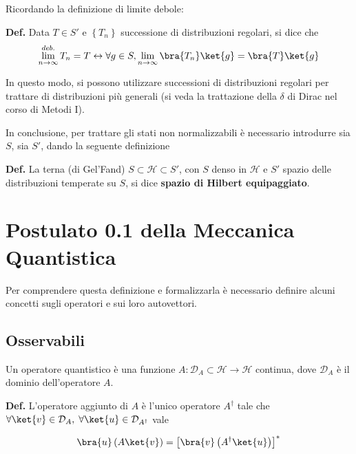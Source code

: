 Ricordando la definizione di limite debole:

\textbf{Def.} Data $ T\in S' $ e $\left\{ T_n \right\}$ successione di distribuzioni
regolari, si dice che 
$$ \lim\limits_{n\to\infty}^{deb.} T_n = T \leftrightarrow 
\forall g\in S, \lim\limits_{n\to\infty} \bra{T_n}\ket{g} = \bra{T}\ket{g}$$

In questo modo, si possono utilizzare successioni di distribuzioni regolari per
trattare di distribuzioni più generali (si veda la trattazione della $ \delta $ di 
Dirac nel corso di Metodi I).

In conclusione, per trattare gli stati non normalizzabili è necessario introdurre sia
$ S $, sia $ S' $, dando la seguente definizione

\textbf{Def.} La terna (di Gel'Fand) $ S\subset\mathcal{H}\subset S' $, con $S$ denso in
$ \mathcal{H} $ e $ S' $ spazio delle distribuzioni temperate su $ S$, si dice 
\textbf{spazio di Hilbert equipaggiato}.
\newpage

\section{Postulato 0.1 della Meccanica Quantistica}

\noindent{}

Per comprendere questa definizione e formalizzarla è necessario definire alcuni concetti sugli
operatori e sui loro autovettori.

\subsection{Osservabili}

Un operatore quantistico è una funzione $ A: \mathcal{D}_A\subset\mathcal{H}\to\mathcal{H} $
continua, dove $ \mathcal{D}_A $ è il dominio dell'operatore $ A $.

\textbf{Def.} L'operatore aggiunto di $ A $ è l'unico operatore $ A^{\dagger} $ tale che
$ \forall \ket{v}\in\mathcal{D}_A,\; \forall \ket{u}\in\mathcal{D}_{A^{\dagger}}$ vale

$$ \bra{u} \left( A\ket{v} \right) = \left[ \bra{v} \left( A^{\dagger}\ket{u} \right) \right]^* $$ 
 
